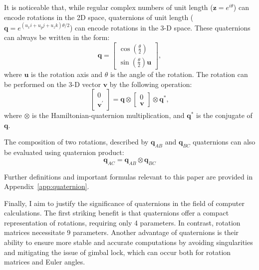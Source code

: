 It is noticeable that, while regular complex numbers of unit length ($\mathbf{z}=e^{i\theta}$) can encode rotations in the 2D space, quaternions of unit length ($\mathbf{q}=e^{(u_{x}i+u_{y}j+u_{z}k)\theta/2}$) can encode rotations in the 3-D space. These quaternions can always be written in the form:
\begin{equation}
    \mathbf{q}=\begin{bmatrix}
        \cos\left(\frac{\theta}{2}\right) \\
        \sin\left(\frac{\theta}{2}\right)\mathbf{u}
    \end{bmatrix},
\end{equation}
where $\mathbf{u}$ is the rotation axis and $\theta$ is the angle of the rotation. The rotation can be performed on the 3-D vector $\mathbf{v}$ by the following operation:
\begin{equation}
    \begin{bmatrix}
        0 \\ 
        \mathbf{v}^{'}
    \end{bmatrix}=\mathbf{q}\otimes\begin{bmatrix}
        0 \\ 
        \mathbf{v}
    \end{bmatrix}\otimes\mathbf{q}^*,
    \label{eq:quat-rot}
\end{equation}
where $\otimes$ is the Hamiltonian-quaternion multiplication, and $\mathbf{q}^*$ is the conjugate of $\mathbf{q}$. 

The composition of two rotations, described by $\mathbf{q}_{AB}$ and $\mathbf{q}_{BC}$ quaternions can also be evaluated using quaternion product:
\begin{equation}
    \mathbf{q}_{AC}=\mathbf{q}_{AB}\otimes\mathbf{q}_{BC}
\end{equation}

Further definitions and important formulas relevant to this paper are provided in Appendix~\ref{app:quaternion}.

Finally, I aim to justify the significance of quaternions in the field of computer calculations. The first striking benefit is that quaternions offer a compact representation of rotations, requiring only 4 parameters. In contrast, rotation matrices necessitate  9 parameters. Another advantage of quaternions is their ability to ensure more stable and accurate computations by avoiding singularities and mitigating the issue of gimbal lock, which can occur both for rotation matrices and Euler angles.